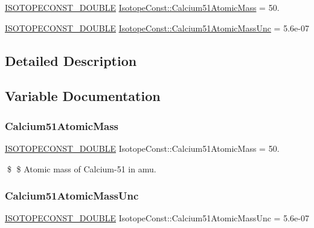 \begin{DoxyCompactItemize}
\item 
\mbox{\hyperlink{group___isotope_const-_macros_ga8f45a7272ce02c0b4c65c44636ed719a}{I\+S\+O\+T\+O\+P\+E\+C\+O\+N\+S\+T\+\_\+\+D\+O\+U\+B\+LE}} \mbox{\hyperlink{group___isotope_const-_calcium-_ca51_ga71ba96b31f00d0454d80c90ea91a47e6}{Isotope\+Const\+::\+Calcium51\+Atomic\+Mass}} = 50.
\item 
\mbox{\hyperlink{group___isotope_const-_macros_ga8f45a7272ce02c0b4c65c44636ed719a}{I\+S\+O\+T\+O\+P\+E\+C\+O\+N\+S\+T\+\_\+\+D\+O\+U\+B\+LE}} \mbox{\hyperlink{group___isotope_const-_calcium-_ca51_gaa8bada905fc5992cc3afaed398766747}{Isotope\+Const\+::\+Calcium51\+Atomic\+Mass\+Unc}} = 5.\+6e-\/07
\end{DoxyCompactItemize}


\subsection{Detailed Description}


\subsection{Variable Documentation}
\mbox{\label{group___isotope_const-_calcium-_ca51_ga71ba96b31f00d0454d80c90ea91a47e6}} 
\subsubsection{\texorpdfstring{Calcium51\+Atomic\+Mass}{Calcium51AtomicMass}}
{\footnotesize\ttfamily \mbox{\hyperlink{group___isotope_const-_macros_ga8f45a7272ce02c0b4c65c44636ed719a}{I\+S\+O\+T\+O\+P\+E\+C\+O\+N\+S\+T\+\_\+\+D\+O\+U\+B\+LE}} Isotope\+Const\+::\+Calcium51\+Atomic\+Mass = 50.}

\$ \$ Atomic mass of Calcium-\/51 in amu. \mbox{\label{group___isotope_const-_calcium-_ca51_gaa8bada905fc5992cc3afaed398766747}} 
\subsubsection{\texorpdfstring{Calcium51\+Atomic\+Mass\+Unc}{Calcium51AtomicMassUnc}}
{\footnotesize\ttfamily \mbox{\hyperlink{group___isotope_const-_macros_ga8f45a7272ce02c0b4c65c44636ed719a}{I\+S\+O\+T\+O\+P\+E\+C\+O\+N\+S\+T\+\_\+\+D\+O\+U\+B\+LE}} Isotope\+Const\+::\+Calcium51\+Atomic\+Mass\+Unc = 5.\+6e-\/07}

